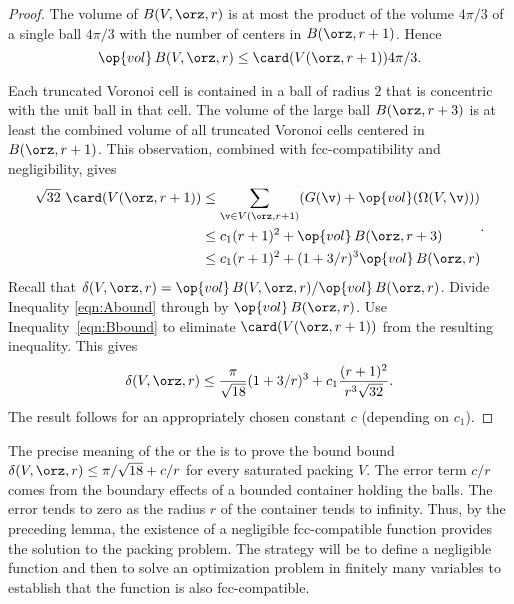 \begin{proof} 
The volume of $B( V,\orz,r)$ is at most the product of the volume
$4\pi/3$ of a single ball $4\pi/3$ with the number of centers in
$B(\orz,r+1)$.  Hence
\begin{equation} 
\op{vol}\, B( V,\orz,r) \le \card( V(\orz,r+1)) 4\pi/3.
\label{eqn:Abound}
\end{equation}

Each truncated Voronoi cell is contained in a ball of
radius $2$ that is concentric with the unit ball in that cell.  The volume
of the large ball $B(\orz,r+3)$ is at least the combined volume of 
all truncated Voronoi
cells centered in $B(\orz,r+1)$. This observation,
combined with fcc-compatibility and negligibility, gives
\begin{equation} 
\begin{split} 
\sqrt{32}\,\,\card( V(\orz,r+1))
&\le \sum_{\v\in V(\orz,r+1)} (G(\v) +
\op{vol}(\Omega(V,\v))) \\
&\le c_1 (r+1)^2 + \op{vol}\,B(\orz,r+3) \\
&\le c_1 (r+1)^2 + (1+3/r)^3 \op{vol}\,B(\orz,r)
\label{eqn:Bbound}
\end{split}.
\end{equation}
%
Recall that $\delta( V,\orz,r)=
\op{vol}\,B( V,\orz,r)/\op{vol}\,B(\orz,r)$. Divide Inequality
\ref{eqn:Abound} through by $\op{vol}\,B(\orz,r)$.  Use
Inequality~\ref{eqn:Bbound} to eliminate $\card( V(\orz,r+1))$ from the
resulting inequality.  This gives
\begin{displaymath}\delta( V,\orz,r)
\le \frac{\pi}{\sqrt{18}} (1+3/r)^3 + c_1 \frac{(r+1)^2}{r^3\sqrt{32}}.
\end{displaymath}
The result follows for an appropriately chosen constant $c$
(depending on $c_1$).
\end{proof}

\begin{remark}
\label{remark:precise} 
The precise meaning of the  or the
 is to prove the bound bound $\delta(
V,\orz,r) \le \pi/\sqrt{18} + c/r$ for every saturated packing $ V$.
The error term $c/r$ comes from the boundary effects of a bounded
container holding the balls.  The error tends to zero as the radius
$r$ of the container tends to infinity.  Thus, by the preceding lemma,
the existence of a negligible fcc-compatible function provides the
solution to the packing problem.  The strategy will be to define a
negligible function and then to solve an optimization problem in
finitely many variables to establish that the function is also
fcc-compatible.
\end{remark}





